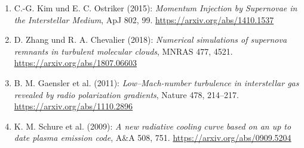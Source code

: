 \documentclass[11pt,a4paper]{article}
\begin{document}
\begin{enumerate}
  \item C.-G. Kim und E. C. Ostriker (2015): \emph{Momentum Injection by
    Supernovae in the Interstellar Medium}, ApJ 802, 99.
    \url{https://arxiv.org/abs/1410.1537}
  \item D. Zhang und R. A. Chevalier (2018): \emph{Numerical simulations of
    supernova remnants in turbulent molecular clouds}, MNRAS 477, 4521.
    \url{https://arxiv.org/abs/1807.06603}
  \item B. M. Gaensler et al. (2011): \emph{Low--Mach-number turbulence in
    interstellar gas revealed by radio polarization gradients}, Nature 478,
    214--217. \url{https://arxiv.org/abs/1110.2896}
  \item K. M. Schure et al. (2009): \emph{A new radiative cooling curve based
    on an up to date plasma emission code}, A\&A 508, 751.
    \url{https://arxiv.org/abs/0909.5204}
\end{enumerate}
\end{document}
